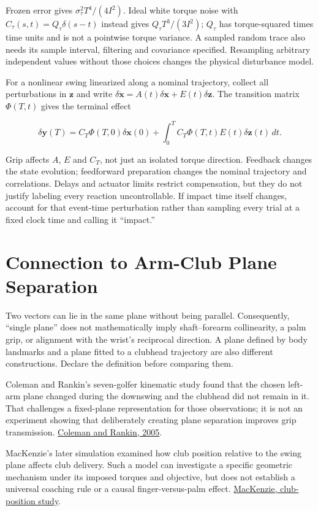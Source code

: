 \documentclass[
  11pt,
]{article}
\begin{document}
Frozen error gives \(\sigma_\tau^2T^4/(4I^2)\). Ideal white torque noise
with \(C_\tau(s,t)=Q_\tau\delta(s-t)\) instead gives
\(Q_\tau T^3/(3I^2)\); \(Q_\tau\) has torque-squared times time units
and is not a pointwise torque variance. A sampled random trace also
needs its sample interval, filtering and covariance specified.
Resampling arbitrary independent values without those choices changes
the physical disturbance model.

For a nonlinear swing linearized along a nominal trajectory, collect all
perturbations in \(\mathbf z\) and write
\(\delta\dot{\mathbf x}=A(t)\delta\mathbf x+E(t)\delta\mathbf z\). The
transition matrix \(\Phi(T,t)\) gives the terminal effect

\[
\delta\mathbf y(T)=C_T\Phi(T,0)\delta\mathbf x(0)
+\int_0^T C_T\Phi(T,t)E(t)\delta\mathbf z(t)\,dt.
\]

Grip affects \(A\), \(E\) and \(C_T\), not just an isolated torque
direction. Feedback changes the state evolution; feedforward preparation
changes the nominal trajectory and correlations. Delays and actuator
limits restrict compensation, but they do not justify labeling every
reaction uncontrollable. If impact time itself changes, account for that
event-time perturbation rather than sampling every trial at a fixed
clock time and calling it ``impact.''

\section{Connection to Arm-Club Plane
Separation}\label{connection-to-arm-club-plane-separation}

Two vectors can lie in the same plane without being parallel.
Consequently, ``single plane'' does not mathematically imply
shaft--forearm collinearity, a palm grip, or alignment with the wrist's
reciprocal direction. A plane defined by body landmarks and a plane
fitted to a clubhead trajectory are also different constructions.
Declare the definition before comparing them.

Coleman and Rankin's seven-golfer kinematic study found that the chosen
left-arm plane changed during the downswing and the clubhead did not
remain in it. That challenges a fixed-plane representation for those
observations; it is not an experiment showing that deliberately creating
plane separation improves grip transmission.
\href{https://pubmed.ncbi.nlm.nih.gov/15966340/}{Coleman and Rankin,
2005}.

MacKenzie's later simulation examined how club position relative to the
swing plane affects club delivery. Such a model can investigate a
specific geometric mechanism under its imposed torques and objective,
but does not establish a universal coaching rule or a causal
finger-versus-palm effect.
\href{https://pubmed.ncbi.nlm.nih.gov/22900397/}{MacKenzie,
club-position study}.
\end{document}

